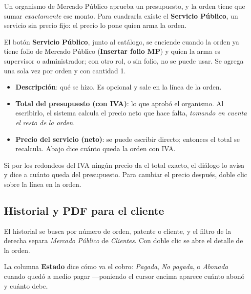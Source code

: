 \documentclass[11pt,a4paper]{article}
\begin{document}

Un organismo de Mercado Público aprueba un presupuesto, y la orden tiene que
sumar \emph{exactamente} ese monto. Para cuadrarla existe el \textbf{Servicio
Público}, un servicio sin precio fijo: el precio lo pone quien arma la orden.

El botón \textbf{Servicio Público}, junto al catálogo, se enciende cuando la orden
ya tiene folio de Mercado Público (\textbf{Insertar folio MP}) y quien la arma es supervisor o administrador;
con otro rol, o sin folio, no se puede usar. Se agrega una sola vez por orden y
con cantidad 1.


\begin{itemize}
  \item \textbf{Descripción}: qué se hizo. Es opcional y sale en la línea de la
        orden.
  \item \textbf{Total del presupuesto (con IVA)}: lo que aprobó el organismo.
        Al escribirlo, el sistema calcula el precio neto que hace falta,
        \emph{tomando en cuenta el resto de la orden}.
  \item \textbf{Precio del servicio (neto)}: se puede escribir directo; entonces
        el total se recalcula. Abajo dice cuánto queda la orden con IVA.
\end{itemize}

Si por los redondeos del IVA ningún precio da el total exacto, el diálogo lo
avisa y dice a cuánto queda del presupuesto. Para cambiar el precio después,
doble clic sobre la línea en la orden.

\subsection{Historial y PDF para el cliente}


El historial se busca por número de orden, patente o cliente, y el filtro de la
derecha separa \emph{Mercado Público} de \emph{Clientes}. Con doble clic se abre
el detalle de la orden.

La columna \textbf{Estado} dice cómo va el cobro: \emph{Pagada},
\emph{No pagada}, o \emph{Abonada} cuando quedó a medio pagar —poniendo el
cursor encima aparece cuánto abonó y cuánto debe.
\end{document}
